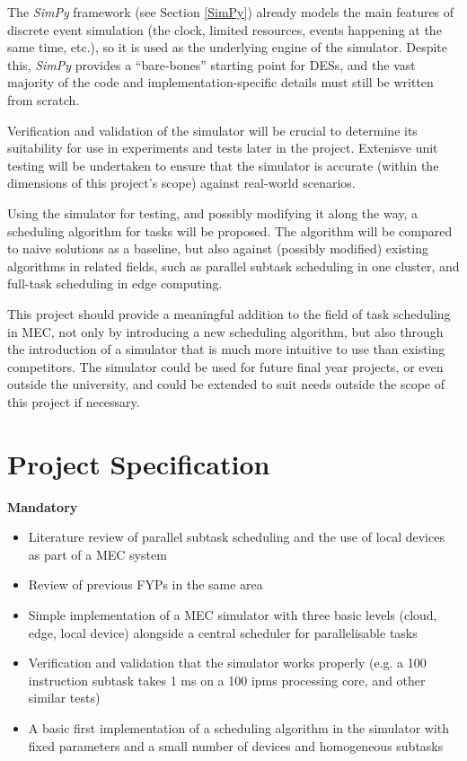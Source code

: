 \documentclass[]{UCD_CS_Interim_Report}
\begin{document}
The \textit{SimPy} framework (see Section \ref{SimPy}) already models the main features of discrete event simulation (the clock, limited resources, events happening at the same time, etc.), so it is used as the underlying engine of the simulator. Despite this, \textit{SimPy} provides a \enquote{bare-bones} starting point for DESs, and the vast majority of the code and implementation-specific details must still be written from scratch.

Verification and validation of the simulator will be crucial to determine its suitability for use in experiments and tests later in the project. Extenisve unit testing will be undertaken to ensure that the simulator is accurate (within the dimensions of this project's scope) against real-world scenarios.

Using the simulator for testing, and possibly modifying it along the way, a scheduling algorithm for tasks will be proposed. The algorithm will be compared to naive solutions as a baseline, but also against (possibly modified) existing algorithms in related fields, such as parallel subtask scheduling in one cluster, and full-task scheduling in edge computing.

This project should provide a meaningful addition to the field of task scheduling in MEC, not only by introducing a new scheduling algorithm, but also through the introduction of a simulator that is much more intuitive to use than existing competitors. The simulator could be used for future final year projects, or even outside the university, and could be extended to suit needs outside the scope of this project if necessary.

\section{Project Specification}
\textbf{Mandatory}
\vspace{-1.5em}
\begin{itemize}
    \item Literature review of parallel subtask scheduling and the use of local devices as part of a MEC system
    \item Review of previous FYPs in the same area
    \item Simple implementation of a MEC simulator with three basic levels (cloud, edge, local device) alongside a central scheduler for parallelisable tasks
    \item Verification and validation that the simulator works properly (e.g. a 100 instruction subtask takes 1 ms on a 100 ipms processing core, and other similar tests)
    \item A basic first implementation of a scheduling algorithm in the simulator with fixed parameters and a small number of devices and homogeneous subtasks
\end{itemize}
\vspace{-0.5em}
\end{document}
